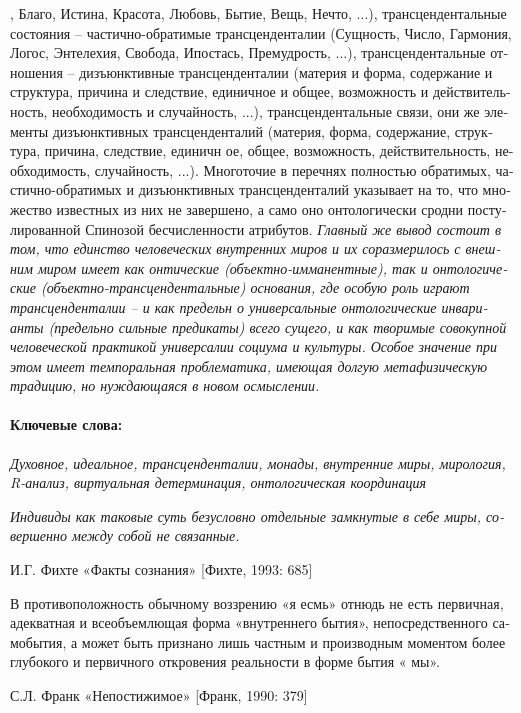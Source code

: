 \begin{russian}
{{    , Благо, Истина, Красота, Любовь, Бытие, Вещь, Нечто, ...), трансцендентальные состояния – частично-обратимые трансценденталии (Сущность, Число, Гармония, Логос, Энтелехия, Свобода, Ипостась, Премудрость, ...), трансцендентальные отношения – дизъюнктивные трансценденталии (материя
     и форма, содержание и структура, причина и следствие, единичное и общее, возможность и действительность, необходимость и случайность, ...), трансцендентальные связи, они же элементы дизъюнктивных трансценденталий (материя, форма, содержание, структура, причина, следствие, единичн
    ое, общее, возможность, действительность, необходимость, случайность, ...). Многоточие в перечнях полностью обратимых, частично-обратимых и дизъюнктивных трансценденталий указывает на то, что множество известных из них не завершено, а само оно онтологически сродни постулированной 
    Спинозой бесчисленности атрибутов. }
    \textit{Главный же вывод состоит в том, что единство человеческих внутренних миров и их соразмерилось с внешним миром имеет как онтические (объектно-имманентные), так и онтологические (объектно-трансцендентальные) основания, где особую роль играют трансценденталии – и как предельн
    о универсальные онтологические инварианты (предельно сильные предикаты) всего сущего, и как творимые совокупной человеческой практикой универсалии социума и культуры. Особое значение при этом имеет темпоральная проблематика, имеющая долгую метафизическую традицию, но нуждающаяся в
     новом осмыслении.}

    \paragraph{Ключевые слова:} {\itshape Духовное, идеальное, трансценденталии, монады, внутренние миры, мирология, R-анализ, виртуальная детерминация, онтологическая координация}

    \textit{Индивиды как таковые суть безусловно отдельные замкнутые в себе миры, совершенно между собой не связанные.}
    {\raggedleft И.Г. Фихте «Факты сознания» [Фихте, 1993: 685] \par}

    В противоположность обычному воззрению «я есмь» отнюдь не есть первичная, адекватная и всеобъемлющая форма «внутреннего бытия», непосредственного самобытия, а может быть признано лишь частным и производным моментом более глубокого и первичного откровения реальности в форме бытия «
    мы». 
    {\raggedleft С.Л. Франк «Непостижимое»  [Франк, 1990: 379] \par}

}
\end{russian}
